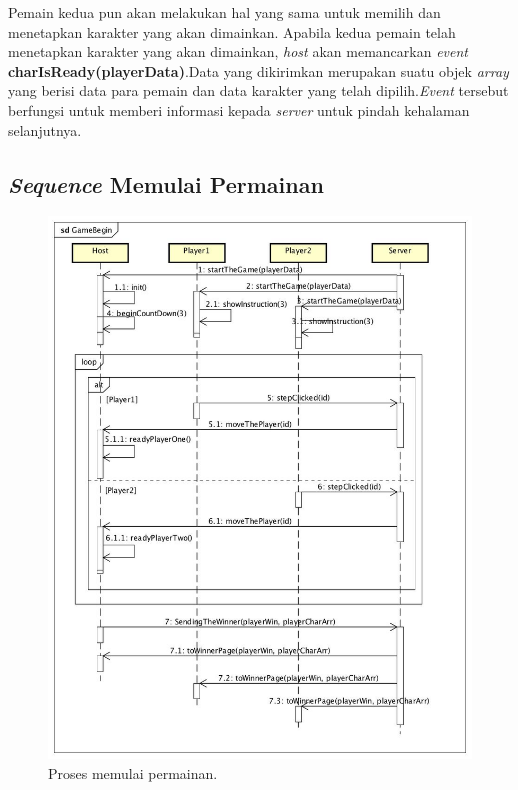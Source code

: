 Pemain kedua pun akan melakukan hal yang sama untuk memilih dan menetapkan karakter yang akan dimainkan. Apabila kedua pemain telah menetapkan karakter yang akan dimainkan, \textit{host} akan memancarkan \textit{event} \textbf{charIsReady(playerData)}.Data yang dikirimkan merupakan suatu objek \textit{array} yang berisi data para pemain dan data karakter yang telah dipilih.\textit{Event} tersebut berfungsi untuk memberi informasi kepada \textit{server} untuk pindah kehalaman selanjutnya.

\subsection{\textit{Sequence} Memulai Permainan}

\begin{figure}[H]
	\centering
	\includegraphics[scale=0.33]{Gambar/GameBegin}
	\caption{Proses memulai permainan.}
	\label{fig:3_GameBegin}
\end{figure}


